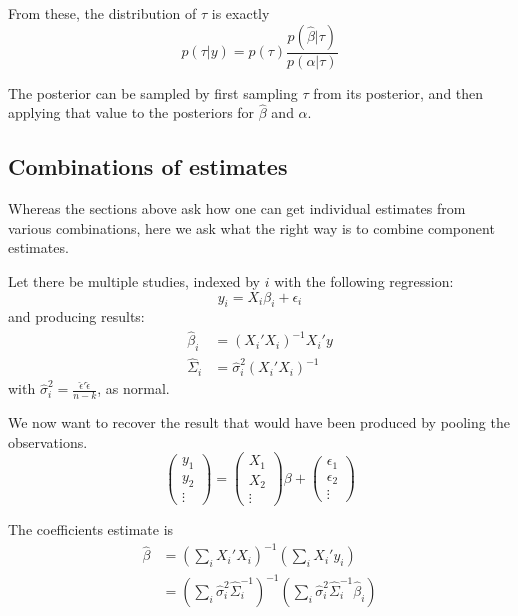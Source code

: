 \documentclass[12pt, oneside]{amsart}
\begin{document}
From these, the distribution of $\tau$ is exactly
\[
p(\tau | y) = p(\tau) \frac{p(\hat\beta | \tau)}{p(\alpha | \tau)}
\]

The posterior can be sampled by first sampling $\tau$ from its
posterior, and then applying that value to the posteriors for
$\hat\beta$ and $\alpha$.

\subsection{Combinations of estimates}

Whereas the sections above ask how one can get individual estimates
from various combinations, here we ask what the right way is to
combine component estimates.

\newpage
Let there be multiple studies, indexed by $i$ with the following
regression:
\[
y_i = X_i \beta_i + \epsilon_i
\]
and producing results:
\begin{align*}
  \hat\beta_i &= (X_i' X_i)^{-1} X_i' y \\
  \hat\Sigma_i &= \hat\sigma_i^2 (X_i' X_i)^{-1}
\end{align*}
with $\hat\sigma_i^2 = \frac{\hat\epsilon'\hat\epsilon}{n - k}$, as normal.

We now want to recover the result that would have been produced by
pooling the observations.
\[
\left(\begin{array}{c}
        y_1 \\
        y_2 \\
        \vdots
      \end{array}\right) = 
    \left(\begin{array}{c}
            X_1 \\
            X_2 \\
            \vdots
          \end{array}\right) \beta + \left(\begin{array}{c}
                                             \epsilon_1 \\
                                             \epsilon_2 \\
                                             \vdots
                                           \end{array}\right)
\]

The coefficients estimate is
\begin{align*}
\hat\beta &= \left(\sum_i X_i' X_i\right)^{-1}
            \left(\sum_i X_i' y_i\right) \\
          &= \left(\sum_i \hat\sigma_i^2 \hat\Sigma_i^{-1}\right)^{-1}
            \left(\sum_i \hat\sigma_i^2 \hat\Sigma_i^{-1} \hat\beta_i \right) \\
\end{align*}
\end{document}
